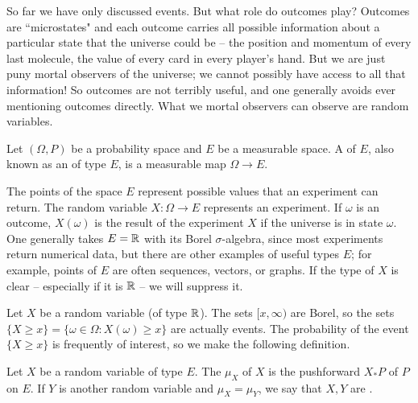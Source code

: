 \begin{subsec}
So far we have only discussed events. But what role do outcomes play?
Outcomes are ``microstates" and each outcome carries all possible information about a particular state that the universe could be -- the position and momentum of every last molecule, the value of every card in every player's hand.
But we are just puny mortal observers of the universe; we cannot possibly have access to all that information!
So outcomes are not terribly useful, and one generally avoids ever mentioning outcomes directly.
What we mortal observers can observe are random variables.
\end{subsec}

\begin{definition}
Let $(\Omega, P)$ be a probability space and $E$ be a measurable space.
A  of  $E$, also known as an  of type $E$, is a measurable map $\Omega \to E$.
\end{definition}

\begin{subsec}
The points of the space $E$ represent possible values that an experiment can return.
The random variable $X: \Omega \to E$ represents an experiment. If $\omega$ is an outcome, $X(\omega)$ is the result of the experiment $X$ if the universe is in state $\omega$.
One generally takes $E = \mathbb{R}$ with its Borel $\sigma$-algebra, since most experiments return numerical data, but there are other examples of useful types $E$; for example, points of $E$ are often sequences, vectors, or graphs.
If the type of $X$ is clear -- especially if it is $\mathbb{R}$ -- we will suppress it.
\end{subsec}

\begin{subsec}
Let $X$ be a random variable (of type $\mathbb{R}$).
The sets $[x, \infty)$ are Borel, so the sets $\{X \geq x\} = \{\omega \in \Omega: X(\omega) \geq x\}$ are actually events.
The probability of the event $\{X \geq x\}$ is frequently of interest, so we make the following definition.
\end{subsec}

\begin{definition}
Let $X$ be a random variable of type $E$.
The  $\mu_X$ of $X$ is the pushforward $X_*P$ of $P$ on $E$.
If $Y$ is another random variable and $\mu_X = \mu_Y$, we say that $X,Y$ are .
\end{definition}

